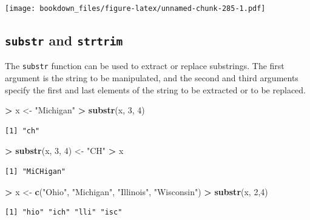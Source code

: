 \documentclass[]{krantz}
\makeatletter
\newenvironment{Shaded}{\begin{snugshade}}{\end{snugshade}}
\newcommand{\KeywordTok}[1]{\textcolor[rgb]{0.27,0.27,0.27}{\textbf{#1}}}
\newcommand{\DecValTok}[1]{\textcolor[rgb]{0.06,0.06,0.06}{#1}}
\newcommand{\StringTok}[1]{\textcolor[rgb]{0.5,0.5,0.5}{#1}}
\newcommand{\OperatorTok}[1]{\textcolor[rgb]{0.43,0.43,0.43}{\textbf{#1}}}
\newcommand{\NormalTok}[1]{#1}
\newenvironment{kframe}{%
\medskip{}
\setlength{\fboxsep}{.8em}
 \def\at@end@of@kframe{}%
 \ifinner\ifhmode%
  \def\at@end@of@kframe{\end{minipage}}%
  \begin{minipage}{\columnwidth}%
 \fi\fi%
 \def\FrameCommand##1{\hskip\@totalleftmargin \hskip-\fboxsep
 \colorbox{shadecolor}{##1}\hskip-\fboxsep
     \hskip-\linewidth \hskip-\@totalleftmargin \hskip\columnwidth}%
 \MakeFramed {\advance\hsize-\width
   \@totalleftmargin\z@ \linewidth\hsize
   \@setminipage}}%
 {\par\unskip\endMakeFramed%
 \at@end@of@kframe}
\renewenvironment{Shaded}{\begin{kframe}}{\end{kframe}}
\makeatother
\begin{document}
\texttt{[image: bookdown\_files/figure-latex/unnamed-chunk-285-1.pdf]}

\subsection{\texorpdfstring{\texttt{substr} and
\texttt{strtrim}}{substr and strtrim}}\label{substr-and-strtrim}

The \texttt{substr} function can be used to extract or replace
substrings. The first argument is the string to be manipulated, and the
second and third arguments specify the first and last elements of the
string to be extracted or to be replaced.

\begin{Shaded}
\begin{Highlighting}[]
\OperatorTok{>}\StringTok{ }\NormalTok{x <-}\StringTok{ "Michigan"}
\OperatorTok{>}\StringTok{ }\KeywordTok{substr}\NormalTok{(x, }\DecValTok{3}\NormalTok{, }\DecValTok{4}\NormalTok{)}
\end{Highlighting}
\end{Shaded}

\begin{verbatim}
[1] "ch"
\end{verbatim}

\begin{Shaded}
\begin{Highlighting}[]
\OperatorTok{>}\StringTok{ }\KeywordTok{substr}\NormalTok{(x, }\DecValTok{3}\NormalTok{, }\DecValTok{4}\NormalTok{) <-}\StringTok{ "CH"}
\OperatorTok{>}\StringTok{ }\NormalTok{x}
\end{Highlighting}
\end{Shaded}

\begin{verbatim}
[1] "MiCHigan"
\end{verbatim}

\begin{Shaded}
\begin{Highlighting}[]
\OperatorTok{>}\StringTok{ }\NormalTok{x <-}\StringTok{ }\KeywordTok{c}\NormalTok{(}\StringTok{"Ohio"}\NormalTok{, }\StringTok{"Michigan"}\NormalTok{, }\StringTok{"Illinois"}\NormalTok{, }\StringTok{"Wisconsin"}\NormalTok{)}
\OperatorTok{>}\StringTok{ }\KeywordTok{substr}\NormalTok{(x, }\DecValTok{2}\NormalTok{,}\DecValTok{4}\NormalTok{)}
\end{Highlighting}
\end{Shaded}

\begin{verbatim}
[1] "hio" "ich" "lli" "isc"
\end{verbatim}
\end{document}
